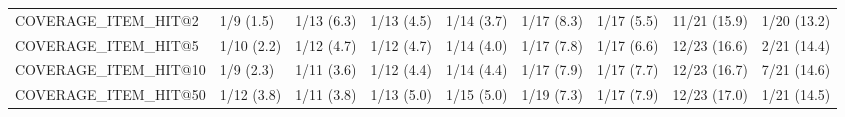 \begin{tabular}{lllllllll}
COVERAGE_ITEM_HIT@2         &      1/9 (1.5) &     1/13 (6.3) &    1/13 (4.5) &    1/14 (3.7) &  1/17 (8.3) &   1/17 (5.5) &   11/21 (15.9) &        1/20 (13.2) \\
COVERAGE_ITEM_HIT@5         &     1/10 (2.2) &     1/12 (4.7) &    1/12 (4.7) &    1/14 (4.0) &  1/17 (7.8) &   1/17 (6.6) &   12/23 (16.6) &        2/21 (14.4) \\
COVERAGE_ITEM_HIT@10        &      1/9 (2.3) &     1/11 (3.6) &    1/12 (4.4) &    1/14 (4.4) &  1/17 (7.9) &   1/17 (7.7) &   12/23 (16.7) &        7/21 (14.6) \\
COVERAGE_ITEM_HIT@50        &     1/12 (3.8) &     1/11 (3.8) &    1/13 (5.0) &    1/15 (5.0) &  1/19 (7.3) &   1/17 (7.9) &   12/23 (17.0) &        1/21 (14.5) \\
\bottomrule
\end{tabular}
